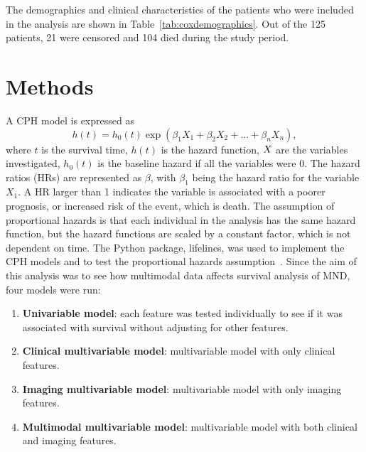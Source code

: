 The demographics and clinical characteristics of the patients who were included in the analysis are shown in Table~\ref{tab:coxdemographics}.
Out of the 125 patients, 21 were censored and 104 died during the study period.

\section{Methods}

A CPH model is expressed as
\begin{equation}\label{eq:coxhazard}
    h(t) = h_0(t) \exp{(\beta_1 X_1 + \beta_2 X_2 + ... + \beta_n X_n)},
\end{equation}
where $t$ is the survival time, $h(t)$ is the hazard function, $\boldmath{X}$ are the variables investigated, $h_0(t)$ is the baseline hazard if all the variables were 0.
The hazard ratios (HRs) are represented as $\beta$, with $\beta_1$ being the hazard ratio for the variable $X_1$.
A HR larger than 1 indicates the variable is associated with a poorer prognosis, or increased risk of the event, which is death.
The assumption of proportional hazards is that each individual in the analysis has the same hazard function, but the hazard functions are scaled by a constant factor, which is not dependent on time.
The Python package, lifelines, was used to implement the CPH models and to test the proportional hazards assumption~\cite{davidson-pilonLifelinesSurvivalAnalysis2019}.
Since the aim of this analysis was to see how multimodal data affects survival analysis of MND, four models were run:
\begin{enumerate}
\setlength\itemsep{-0.5em}
    \item \textbf{Univariable model}: each feature was tested individually to see if it was associated with survival without adjusting for other features.
    \item \textbf{Clinical multivariable model}: multivariable model with only clinical features.
    \item \textbf{Imaging multivariable model}: multivariable model with only imaging features.
    \item \textbf{Multimodal multivariable model}: multivariable model with both clinical and imaging features.
\end{enumerate}



